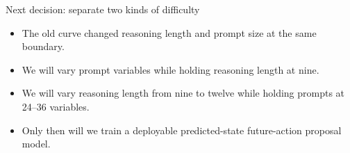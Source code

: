 \documentclass[aspectratio=169]{beamer}
\begin{document}
\begin{frame}{Next decision: separate two kinds of difficulty}
\begin{itemize}
\item The old curve changed reasoning length and prompt size at the same boundary.
\item We will vary prompt variables while holding reasoning length at nine.
\item We will vary reasoning length from nine to twelve while holding prompts at 24--36 variables.
\item Only then will we train a deployable predicted-state future-action proposal model.
\end{itemize}
\end{frame}
\end{document}
